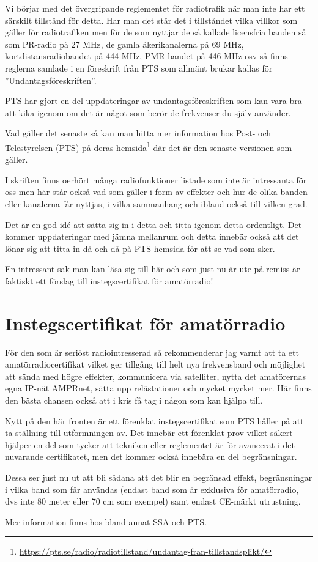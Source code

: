 Vi börjar med det övergripande reglementet för radiotrafik när man inte har ett särskilt tillstånd för detta. Har man det står det i tillståndet vilka villkor som gäller för radiotrafiken men för de som nyttjar de så kallade licensfria banden så som PR-radio på 27 MHz, de gamla åkerikanalerna på 69 MHz, kortdistansradiobandet på 444 MHz, PMR-bandet på 446 MHz osv så finns reglerna samlade i en föreskrift från PTS som allmänt brukar kallas för ''Undantagsföreskriften''.

PTS har gjort en del uppdateringar av undantagsföreskriften som kan vara bra att kika igenom om det är något som berör de frekvenser du själv använder.

Vad gäller det senaste så kan man hitta mer information hos Post- och Telestyrelsen (PTS) på deras hemsida\footnote{\href{https://pts.se/radio/radiotillstand/undantag-fran-tillstandsplikt/}{https://pts.se/radio/radiotillstand/undantag-fran-tillstandsplikt/}} där det är den senaste versionen som gäller.

I skriften finns oerhört många radiofunktioner listade som inte är intressanta för oss men här står också vad som gäller i form av effekter och hur de olika banden eller kanalerna får nyttjas, i vilka sammanhang och ibland också till vilken grad. 

Det är en god idé att sätta sig in i detta och titta igenom detta ordentligt. Det kommer uppdateringar med jämna mellanrum och detta innebär också att det lönar sig att titta in då och då på PTS hemsida för att se vad som sker.

En intressant sak man kan läsa sig till här och som just nu är ute på remiss är faktiskt ett förslag till instegscertifikat för amatörradio!

\section*{Instegscertifikat för amatörradio}

För den som är seriöst radiointresserad så rekommenderar jag varmt att ta ett amatörradiocertifikat vilket ger tillgång till helt nya frekvensband och möjlighet att sända med högre effekter, kommunicera via satelliter, nytta det amatörernas egna IP-nät AMPRnet, sätta upp relästationer och mycket mycket mer. Här finns den bästa chansen också att i kris få tag i någon som kan hjälpa till. 

Nytt på den här fronten är ett förenklat instegscertifikat som PTS håller på att ta ställning till utformningen av. Det innebär ett förenklat prov vilket säkert hjälper en del som tycker att tekniken eller reglementet är för avancerat i det nuvarande certifikatet, men det kommer också innebära en del begränsningar. 

Dessa ser just nu ut att bli sådana att det blir en begränsad effekt, begränsningar i vilka band som får användas (endast band som är exklusiva för amatörradio, dvs inte 80 meter eller 70 cm som exempel) samt endast CE-märkt utrustning.

Mer information finns hos bland annat SSA och PTS.

\clearpage
	
